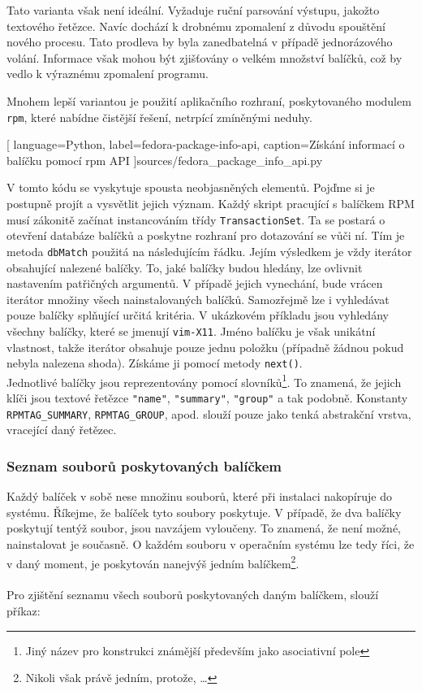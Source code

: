 \documentclass[
  field=inf,
  biblatex,
  glossaries,
  index
]{kidiplom}
\begin{document}
		Tato varianta však není ideální. Vyžaduje ruční parsování výstupu, jakožto textového řetězce. Navíc dochází k drobnému zpomalení z důvodu spouštění nového procesu. Tato prodleva by byla zanedbatelná v případě jednorázového volání. Informace však mohou být zjišťovány o velkém množství balíčků, což by vedlo k výraznému zpomalení programu.

		Mnohem lepší variantou je použití aplikačního rozhraní, poskytovaného modulem \texttt{rpm}, které nabídne čistější řešení, netrpící zmíněnými neduhy.

		
		[
			language=Python,
			label=fedora-package-info-api,
			caption={Získání informací o balíčku pomocí rpm API}
		]{sources/fedora_package_info_api.py}

		V tomto kódu se vyskytuje spousta neobjasněných elementů. Pojďme si je postupně projít a vysvětlit jejich význam. Každý skript pracující s balíčkem RPM musí zákonitě začínat instancováním třídy \texttt{TransactionSet}. Ta se postará o otevření databáze balíčků a poskytne rozhraní pro dotazování se vůči ní. Tím je metoda \texttt{dbMatch} použitá na následujícím řádku. Jejím výsledkem je vždy iterátor obsahující nalezené balíčky. To, jaké balíčky budou hledány, lze ovlivnit nastavením patřičných argumentů. V případě jejich vynechání, bude vrácen iterátor množiny všech nainstalovaných balíčků. Samozřejmě lze i vyhledávat pouze balíčky splňující určitá kritéria. V ukázkovém příkladu jsou vyhledány všechny balíčky, které se jmenují \texttt{vim-X11}. Jméno balíčku je však unikátní vlastnost, takže iterátor obsahuje pouze jednu položku (případně žádnou pokud nebyla nalezena shoda). Získáme ji pomocí metody \texttt{next()}.
		\\
		Jednotlivé balíčky jsou reprezentovány pomocí slovníků\footnote{Jiný název pro konstrukci známější především jako asociativní pole}. To znamená, že jejich klíči jsou textové řetězce \texttt{"name"}, \texttt{"summary"}, \texttt{"group"} a tak podobně. Konstanty \texttt{RPMTAG\_SUMMARY}, \texttt{RPMTAG\_GROUP}, apod. slouží pouze jako tenká abstrakční vrstva, vracející daný řetězec.

		\subsubsection{Seznam souborů poskytovaných balíčkem}
		Každý balíček v sobě nese množinu souborů, které při instalaci nakopíruje do systému. Říkejme, že balíček tyto soubory poskytuje. V případě, že dva balíčky poskytují tentýž soubor, jsou navzájem vyloučeny. To znamená, že není možné, nainstalovat je současně. O každém souboru v operačním systému lze tedy říci, že v daný moment, je poskytován nanejvýš jedním balíčkem\footnote{Nikoli však právě jedním, protože, \dots}.
		\\
		\\
		Pro zjištění seznamu všech souborů poskytovaných daným balíčkem, slouží příkaz:
\end{document}
